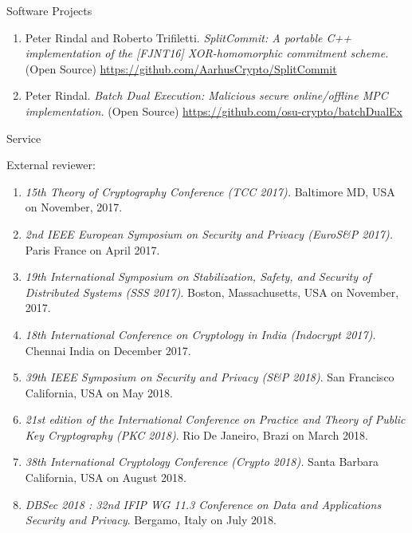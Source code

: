 \documentclass{resume} %
\begin{document}
\begin{rSection}{Software Projects}
\begin{enumerate}[label=S\arabic* --]
		\item Peter Rindal and Roberto Trifiletti. \emph{SplitCommit: A portable C++ implementation of the [FJNT16] XOR-homomorphic commitment scheme.} (Open Source) \url{https://github.com/AarhusCrypto/SplitCommit}
		
		\item Peter Rindal. \emph{Batch Dual Execution: Malicious secure online/offline MPC implementation.}  (Open Source) \url{https://github.com/osu-crypto/batchDualEx}
	\end{enumerate}
	
\end{rSection}




\begin{rSection}{Service}
	
	External reviewer:
	\begin{enumerate}[label=E\arabic* --]
		
		\item \emph{15th Theory of Cryptography Conference (TCC 2017).}  Baltimore MD, USA on November, 2017.
		
		\item \emph{2nd IEEE European Symposium on Security and Privacy (EuroS\&P 2017).} Paris France on April 2017.
		
		\item \emph{19th International Symposium on Stabilization, Safety, and Security of Distributed Systems (SSS 2017).} Boston, Massachusetts, USA on November, 2017.
		
		\item \emph{ 18th International Conference on Cryptology in India (Indocrypt 2017)}. Chennai India on December 2017.
		
		\item \emph{39th IEEE Symposium on Security and Privacy (S\&P 2018)}. San Francisco California, USA on May 2018.
		
		\item \emph{21st edition of the International Conference on Practice and Theory of Public Key Cryptography (PKC 2018)}. Rio De Janeiro, Brazi on March 2018.
		
		
		\item \emph{ 38th International Cryptology Conference (Crypto 2018).} Santa Barbara California, USA on August 2018.
		
		\item \emph{DBSec 2018 : 32nd IFIP WG 11.3 Conference on Data and Applications Security and Privacy}.  Bergamo, Italy on July 2018.
		
	\end{enumerate}
	
\end{rSection}
\end{document}
